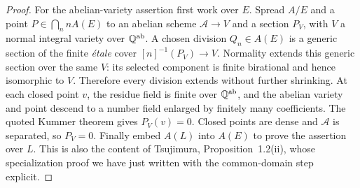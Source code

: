 \begin{proof}
For the abelian-variety assertion first work over $E$. Spread $A/E$
and a point $P\in\bigcap_n nA(E)$ to an abelian scheme
$\mathcal A\to V$ and a section $P_V$, with $V$ a normal integral
variety over $\mathbb Q^{\mathrm{ab}}$. A chosen division $Q_n\in A(E)$
is a generic section of the finite \emph{\'etale} cover
$[n]^{-1}(P_V)\to V$. Normality extends this generic section over
the same $V$: its selected component is finite birational and hence
isomorphic to $V$. Therefore every division extends without further
shrinking. At each closed point $v$, the residue field is finite over
$\mathbb Q^{\mathrm{ab}}$, and the abelian variety and point descend to a
number field enlarged by finitely many coefficients. The quoted
Kummer theorem gives $P_V(v)=0$. Closed points are dense and
$\mathcal A$ is separated, so $P_V=0$. Finally embed $A(L)$ into
$A(E)$ to prove the assertion over $L$. This is also the content of
Tsujimura, Proposition~1.2(ii), whose specialization proof we have
just written with the common-domain step explicit.
\end{proof}


